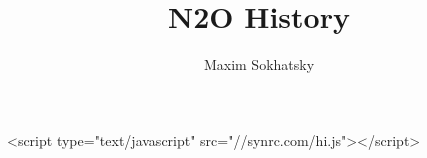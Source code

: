 

\title{N2O History}
\author{Maxim Sokhatsky}


\begin{rawhtml}
<script type="text/javascript" src="//synrc.com/hi.js"></script>
\end{rawhtml}
